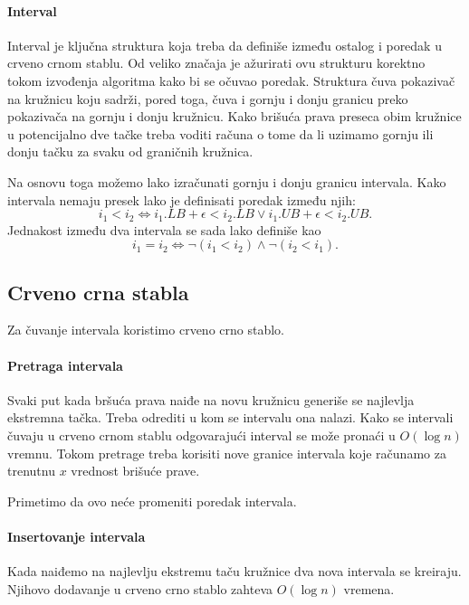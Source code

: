\documentclass[a4paper,12pt]{article}
\begin{document}
\paragraph{Interval}
\label{par:Interval}
Interval je ključna struktura koja treba da definiše između ostalog i poredak u crveno crnom stablu. Od veliko značaja je ažurirati ovu strukturu korektno tokom izvođenja algoritma kako bi se očuvao poredak. Struktura čuva pokazivač na kružnicu koju sadrži, pored toga, čuva i gornju i donju granicu preko pokazivača na gornju i donju kružnicu. Kako brišuća prava preseca obim kružnice u potencijalno dve tačke treba voditi računa o tome da li uzimamo gornju ili donju tačku za svaku od graničnih kružnica.

Na osnovu toga možemo lako izračunati gornju i donju granicu intervala. Kako intervala nemaju presek lako je definisati poredak između njih:
\[i_1 < i_2 \iff i_1.LB + \epsilon < i_2.LB \lor i_1.UB + \epsilon < i_2.UB.\]
Jednakost između dva intervala se sada lako definiše kao 
\[i_1 = i_2 \iff \neg (i_1 < i_2) \land \neg (i_2 < i_1).\]

\subsection{Crveno crna stabla}
\label{sub:rbt}

Za čuvanje intervala koristimo crveno crno stablo. 

\paragraph{Pretraga intervala}
\label{par:ints}

Svaki put kada bršuća prava naiđe na novu kružnicu generiše se najlevlja ekstremna tačka. Treba odrediti u kom se intervalu ona nalazi. Kako se intervali čuvaju u crveno crnom stablu odgovarajući interval se može pronaći u $O(\log n)$ vremnu. Tokom pretrage treba korisiti nove granice intervala koje računamo za trenutnu $x$ vrednost brišuće prave. 

Primetimo da ovo neće promeniti poredak intervala.

\paragraph{Insertovanje intervala}
\label{par:inti}

Kada naiđemo na najlevlju ekstremu taču kružnice dva nova intervala se kreiraju. Njihovo dodavanje u crveno crno stablo zahteva $O(\log n)$ vremena.
\end{document}
